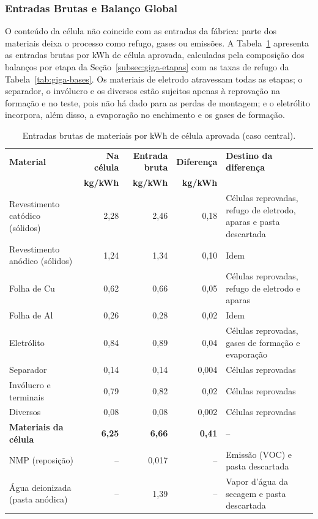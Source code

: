 \subsubsection{Entradas Brutas e Balanço Global}

O conteúdo da célula não coincide com as entradas da fábrica: parte dos materiais
deixa o processo como refugo, gases ou emissões. A
Tabela~\ref{tab:giga-entradas-brutas} apresenta as entradas brutas por kWh de
célula aprovada, calculadas pela composição dos balanços por etapa da
Seção~\ref{subsec:giga-etapas} com as taxas de refugo da
Tabela~\ref{tab:giga-bases}. Os materiais de eletrodo atravessam todas as etapas;
o separador, o invólucro e os diversos estão sujeitos apenas à reprovação na
formação e no teste, pois não há dado para as perdas de montagem; e o eletrólito
incorpora, além disso, a evaporação no enchimento e os gases de formação.

\begin{table}[H]
\centering
\caption{Entradas brutas de materiais por kWh de célula aprovada (caso central).}
\label{tab:giga-entradas-brutas}
\small
\renewcommand{\arraystretch}{1.15}
\begin{tabularx}{\textwidth}{@{} >{\raggedright\arraybackslash}p{4.4cm} r r r X @{}}
\toprule
\textbf{Material} & \textbf{Na célula} & \textbf{Entrada bruta} & \textbf{Diferença} & \textbf{Destino da diferença} \\
 & \textbf{kg/kWh} & \textbf{kg/kWh} & \textbf{kg/kWh} & \\
\midrule
Revestimento catódico (sólidos) & 2,28 & 2,46 & 0,18 & Células reprovadas, refugo de eletrodo, aparas e pasta descartada \\
Revestimento anódico (sólidos) & 1,24 & 1,34 & 0,10 & Idem \\
Folha de Cu & 0,62 & 0,66 & 0,05 & Células reprovadas, refugo de eletrodo e aparas \\
Folha de Al & 0,26 & 0,28 & 0,02 & Idem \\
Eletrólito & 0,84 & 0,89 & 0,04 & Células reprovadas, gases de formação e evaporação \\
Separador & 0,14 & 0,14 & 0,004 & Células reprovadas \\
Invólucro e terminais & 0,79 & 0,82 & 0,02 & Células reprovadas \\
Diversos & 0,08 & 0,08 & 0,002 & Células reprovadas \\
\midrule
\textbf{Materiais da célula} & \textbf{6,25} & \textbf{6,66} & \textbf{0,41} & -- \\
\midrule
NMP (reposição) & -- & 0,017 & -- & Emissão (VOC) e pasta descartada \\
Água deionizada (pasta anódica) & -- & 1,39 & -- & Vapor d'água da secagem e pasta descartada \\
\bottomrule
\end{tabularx}
\end{table}

